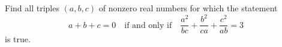Find all triples $(a,b,c)$ of nonzero real numbers for which the statement
\[
a+b+c=0\quad\text{if and only if}\quad \dfrac{a^2}{bc}+\dfrac{b^2}{ca}+\dfrac{c^2}{ab}=3
\]
is true.
